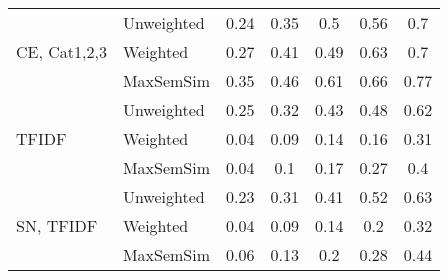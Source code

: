 \documentclass[conference]{IEEEtran}
\begin{document}
\begin{table*}[!h]
\begin{tabular}{l||l|ccccc}
		\multirow{3}{*}{CE, Cat1,2,3} & Unweighted & 0.24 & 0.35 & 0.5 & 0.56 & 0.7\\
		 & Weighted & 0.27 & 0.41 & 0.49 & 0.63 & 0.7\\
		 & MaxSemSim & 0.35 & 0.46 & 0.61 & 0.66 & 0.77\\ 
		\hline
		
		\multirow{3}{*}{TFIDF} & Unweighted & 0.25 & 0.32 & 0.43 & 0.48 & 0.62\\
		 & Weighted & 0.04 & 0.09 & 0.14 & 0.16 & 0.31\\
		 & MaxSemSim & 0.04 & 0.1 & 0.17 & 0.27 & 0.4\\ 
		\hline
		
		\multirow{3}{*}{SN, TFIDF} & Unweighted & 0.23 & 0.31 & 0.41 & 0.52 & 0.63\\
		 & Weighted & 0.04 & 0.09 & 0.14 & 0.2 & 0.32\\
		 & MaxSemSim & 0.06 & 0.13 & 0.2 & 0.28 & 0.44\\ 
		\hline		
	\end{tabular}
\end{table*}		
		
\end{document}
